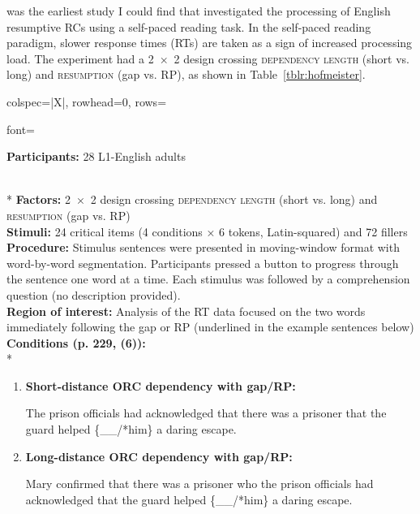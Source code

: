 \textcite{hofmeister.norcliffe2013} was the earliest study I could find that investigated the processing of English resumptive RCs using a self-paced reading task. In the self-paced reading paradigm, slower response times (RTs) are taken as a sign of increased processing load. The experiment had a 2~×~2 design crossing \textsc{dependency length} (short vs. long) and \textsc{resumption} (gap vs. RP), as shown in Table~\ref{tblr:hofmeister}.

\begin{longtblr}[caption={\textcite{hofmeister.norcliffe2013}: Self-paced reading task}, label={tblr:hofmeister}]{colspec={|X|}, rowhead=0, rows={font=\raggedright{}}}\hline
\textbf{Participants:} 28 L1-English adults \vspace{5pt}\rule{0pt}{10pt}\\*
\textbf{Factors:} 2~×~2 design crossing \textsc{dependency length} (short vs. long) and \textsc{resumption} (gap vs. RP) \vspace{5pt}\\
\textbf{Stimuli:} 24 critical items (4 conditions × 6 tokens, Latin-squared) and 72 fillers \vspace{5pt}\\
\textbf{Procedure:} Stimulus sentences were presented in moving-window format with word-by-word segmentation. Participants pressed a button to progress through the sentence one word at a time. Each stimulus was followed by a comprehension question (no description provided). \vspace{5pt}\\
\textbf{Region of interest:} Analysis of the RT data focused on the two words immediately following the gap or RP (underlined in the example sentences below) \vspace{5pt}\\
\textbf{Conditions (p. 229, (6)):} \vspace{5pt}\\*
\begin{varwidth}{\linewidth}\begin{enumerate}[\bfseries (a),itemsep=5pt] 
\item \textbf{Short-distance ORC dependency with gap/RP:}\par\nobreak
The prison officials had acknowledged that there was a prisoner that the guard helped \{\_\_/*him\}  a daring escape.
\item \textbf{Long-distance ORC dependency with gap/RP:}\par\nobreak
Mary confirmed that there was a prisoner who the prison officials had acknowledged that the guard helped \{\_\_/*him\}  a daring escape.
\end{enumerate}\end{varwidth}\\\hline
\end{longtblr}

